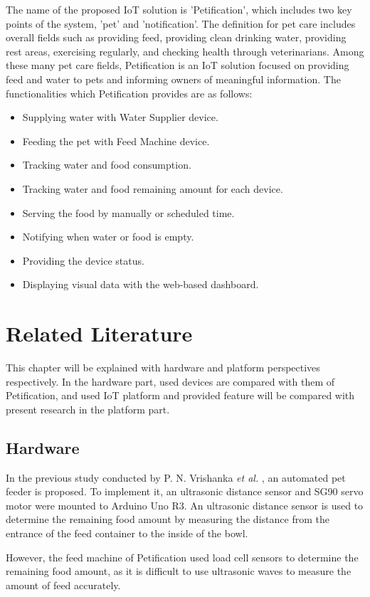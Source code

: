 \documentclass[conference]{IEEEtran}
\begin{document}
The name of the proposed IoT solution is 'Petification', which includes two key points of the system, 'pet' and 'notification'. The definition for pet care includes overall fields such as providing feed, providing clean drinking water, providing rest areas, exercising regularly, and checking health through veterinarians. \cite{b10}  Among these many pet care fields, Petification is an IoT solution focused on providing feed and water to pets and informing owners of meaningful information. The functionalities which Petification provides are as follows:
\begin{itemize}
\item Supplying water with Water Supplier device.
\item Feeding the pet with Feed Machine device.
\item Tracking water and food consumption.
\item Tracking water and food remaining amount for each device.
\item Serving the food by manually or scheduled time.
\item Notifying when water or food is empty.
\item Providing the device status.
\item Displaying visual data with the web-based dashboard.
\end{itemize}

\section{Related Literature}
This chapter will be explained with hardware and platform perspectives respectively. In the hardware part, used devices are compared with them of Petification, and used IoT platform and provided feature will be compared with present research in the platform part.

\subsection{Hardware}
In the previous study conducted by P. N. Vrishanka \textit{et al.} \cite{b11}, an automated pet feeder is proposed. To implement it, an ultrasonic distance sensor and SG90 servo motor were mounted to Arduino Uno R3. An ultrasonic distance sensor is used to determine the remaining food amount by measuring the distance from the entrance of the feed container to the inside of the bowl.

However, the feed machine of Petification used load cell sensors to determine the remaining food amount, as it is difficult to use ultrasonic waves to measure the amount of feed accurately.
\end{document}

